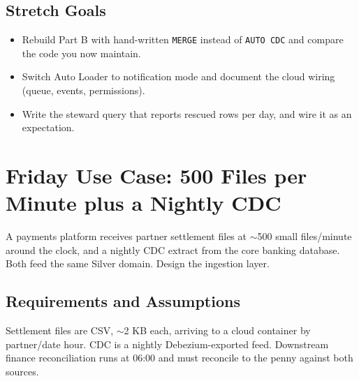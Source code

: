 \subsection*{Stretch Goals}
\begin{itemize}
    \item Rebuild Part B with hand-written \texttt{MERGE} instead of \texttt{AUTO CDC} and compare the code you now maintain.
    \item Switch Auto Loader to notification mode and document the cloud wiring (queue, events, permissions).
    \item Write the steward query that reports rescued rows per day, and wire it as an expectation.
\end{itemize}

\section{Friday Use Case: 500 Files per Minute plus a Nightly CDC}
A payments platform receives partner settlement files at $\sim$500 small files/minute around the clock, and a nightly CDC extract from the core banking database. Both feed the same Silver domain. Design the ingestion layer.

\subsection{Requirements and Assumptions}
Settlement files are CSV, $\sim$2 KB each, arriving to a cloud container by partner/date hour. CDC is a nightly Debezium-exported feed. Downstream finance reconciliation runs at 06:00 and must reconcile to the penny against both sources.

